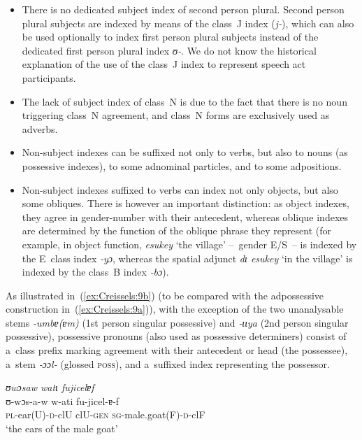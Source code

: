 \documentclass[output=paper]{langscibook}
\begin{document}
\begin{itemize}
\item There is no dedicated subject index of second person plural.  Second
  person plural subjects are indexed by means of the class~J index (\textit{j‑}),
  which can also be used optionally to index first person plural subjects
  instead of the dedicated first person plural index \textit{ʊ‑}.  We do not know
  the historical explanation of the use of the class~J index to represent
  speech act participants.
\item The lack of subject index of class~N is due to the fact that there is no
  noun triggering class~N agreement, and class~N forms are exclusively used as
  adverbs.
\item Non-subject indexes can be suffixed not only to verbs, but also to nouns
  (as possessive indexes), to some adnominal particles, and to some
  adpositions.
\item Non-subject indexes suffixed to verbs can index not only objects, but
  also some obliques.  There is however an important distinction: as object
  indexes, they agree in gender-number with their antecedent, whereas oblique
  indexes are determined by the function of the oblique phrase they represent
  (for example, in object function, \textit{esukey} `the village' --~gender
  E/S~-- is indexed by the E~class index \textit{‑yɔ}, whereas the spatial
  adjunct \textit{dɩ esukey} `in the village' is indexed by the class~B index
  \textit{‑bɔ}).
\end{itemize}

As illustrated in~(\ref{ex:Creissels:9b}) (to be compared with the adpossessive
construction in~(\ref{ex:Creissels:9a})), with the exception of the two unanalysable
stems \textit{‑umbɐ(ɐm)} (1st person singular possessive) and \textit{‑ɩɩya} (2nd
person singular possessive), possessive pronouns (also used as possessive
determiners) consist of a~class prefix marking agreement with their antecedent
or head (the possessee), a~stem \textit{‑ɔɔl‑} (glossed \textsc{poss}), and
a~suffixed index representing the possessor.

\ea
  \label{ex:Creissels:9}
    \ea\label{ex:Creissels:9a}
    
      \textit{ʊwɔsaw watɩ fujicelɐf}\\
      \gll ʊ-wɔs-a-w w-ati fu-jicel-ɐ-f\\
      \textsc{pl}-ear(U)-\textsc{d}-clU clU-\textsc{gen} \textsc{sg}-male.goat(F)-\textsc{d}-clF\\
      \glt `the ears of the male goat'
\end{document}
